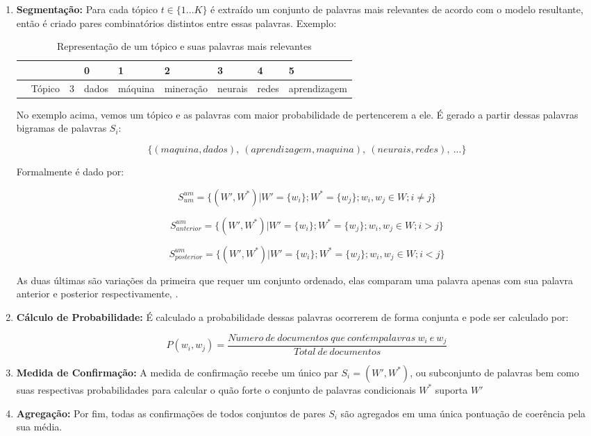 \documentclass[12pt,a4paper]{article}
\begin{document}
  
  \begin{enumerate}
  \item \textbf{Segmentação:} Para cada tópico $t \in \{1 ... K\}$ é extraído um conjunto de palavras mais relevantes de acordo com o modelo resultante, então é criado pares combinatórios distintos entre essas palavras. Exemplo:
  
  \begin{table}[h]
    \centering
    \begin{tabular}{l l l l l l l l l}
    & & &0 &1 &2 &3 &4 &5 \\
    \hline
    &Tópico &3 &dados &máquina &mineração &neurais &redes &aprendizagem \\
    \hline
    \end{tabular}
    \caption{Representação de um tópico e suas palavras mais relevantes}
  \end{table}
  
  No exemplo acima, vemos um tópico e as palavras com maior probabilidade de pertencerem a ele. É gerado a partir dessas palavras bigramas de palavras $S_i$:
  
  \[\{(maquina, dados),\ (aprendizagem, maquina),\ (neurais, redes),\ ...\}\]
  
  Formalmente é dado por:
  
  \begin{equation}
  S_{um}^{um} = \{(W',W^*)|W' = \{w_i\};
  W^* =  \{w_j\};w_i,w_j \in W; i \neq j\}
  \end{equation}
  
  \begin{equation}
  S_{anterior}^{um} = \{(W',W^*)|W' = \{w_i\};
  W^* =  \{w_j\};w_i,w_j \in W; i > j\}
  \end{equation}
  
  \begin{equation}
  S_{posterior}^{um} = \{(W',W^*)|W' = \{w_i\};
  W^* =  \{w_j\};w_i,w_j \in W; i < j\}
  \end{equation}
  
  As duas últimas são variações da primeira que requer um conjunto ordenado, elas comparam uma palavra apenas com sua palavra anterior e posterior respectivamente, \cite{roder2015exploring}.
  
  \item \textbf{Cálculo de Probabilidade:} É calculado a probabilidade dessas palavras ocorrerem de forma conjunta e pode ser calculado por:
  
  \[P(w_i,w_j) = \frac{N\acute{u}mero\ de\ documentos\ que\ cont\acute{e}m palavras\ w_i\ e\ w_j}{Total\ de\ documentos}\]
  
  \item \textbf{Medida de Confirmação:} A medida de confirmação recebe um único par $S_i = (W',W^*)$, ou subconjunto de palavras bem como suas respectivas probabilidades para calcular o quão forte o conjunto de palavras condicionais $W^*$ suporta $W'$
  
  \item \textbf{Agregação:} Por fim, todas as confirmações de todos conjuntos de pares $S_i$ são agregados em uma única pontuação de coerência pela sua média.
  \end{enumerate}
  
\end{document}
